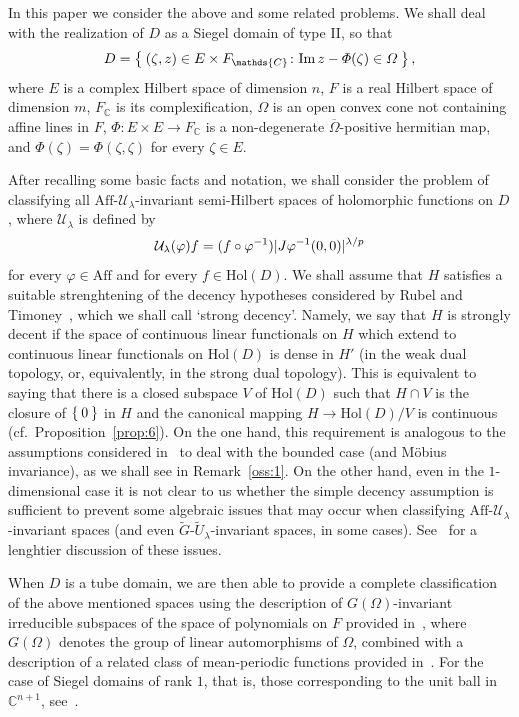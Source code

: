 \documentclass[10.5pt,reqno]{amsart}
\newcommand{\Aff}{\mathrm{Aff}}
\newcommand{\Hol}{\mathrm{Hol}}
\DeclarePairedDelimiter{\abs}{\lvert}{\rvert}
\newcommand{\C}{\mathds{C}}
\newcommand{\Uc}{\mathcal{U}}
\renewcommand{\Im}{\mathrm{Im}\,}
\renewcommand{\phi}{\varphi}
\begin{document}
\medskip

In this paper we consider the above and some related problems. We shall deal with the realization of $D$ as a Siegel domain of type II, so that
\[
D=\Set{(\zeta,z)\in E\times F_\C\colon \Im z-\Phi(\zeta)\in \Omega},
\]
where $E$ is a complex Hilbert space of dimension $n$, $F$ is a real Hilbert space of dimension $m$, $F_\C$ is its complexification, $\Omega$ is an open convex cone not containing affine lines in $F$, $\Phi\colon E\times E\to F_\C$ is a non-degenerate $\overline{\Omega}$-positive hermitian map, and $\Phi(\zeta)=\Phi(\zeta,\zeta)$ for every $\zeta\in E$. 

After recalling some basic facts and notation, we shall consider the problem of classifying all $\Aff$-$\Uc_{\lambda}$-invariant semi-Hilbert spaces of holomorphic functions on $D$, where $\Uc_\lambda$ is defined by
\[
\Uc_\lambda(\phi) f =(f\circ \phi^{-1}) \abs{J\phi^{-1}(0,0) }^{\lambda/p}
\]
for every $\phi\in \Aff$ and for every $f\in \Hol(D)$.
We shall assume that $H$ satisfies a suitable strenghtening of the decency hypotheses considered by Rubel and Timoney~\cite{RubelTimoney}, which we shall call `strong decency'. Namely, we say that $H$ is strongly decent if the space of continuous linear functionals on $H$ which extend to continuous linear functionals on $\Hol(D)$ is dense in $H'$ (in the weak dual topology, or, equivalently, in the strong dual topology). 
This is equivalent to saying that there is a closed subspace $V$ of $\Hol(D)$ such that $H\cap V$ is the closure of $\Set{0}$ in $H$ and the canonical mapping $H\to \Hol(D)/V$ is continuous (cf.~Proposition~\ref{prop:6}). On the one hand, this requirement is analogous to the   assumptions considered in~\cite{ArazyFisher2,Arazy} to deal with the bounded case (and M\"obius invariance), as we shall see in Remark~\ref{oss:1}. On the other hand, even in the $1$-dimensional case it is not clear to us whether the simple decency assumption is sufficient to prevent some algebraic issues that may occur when classifying $\Aff$-$\Uc_\lambda$-invariant spaces (and even $\widetilde G $-$\widetilde U_\lambda$-invariant spaces, in some cases). See~\cite[Section 4]{Rango1} for a lenghtier discussion of these issues.

When $D$ is a tube domain, we are then able to provide a complete classification of the above mentioned spaces using the description of $G(\Omega)$-invariant irreducible subspaces of the space of polynomials on $F$ provided in~\cite[Theorem XI.2.4]{FarautKoranyi}, where $G(\Omega)$ denotes the group of linear automorphisms of $\Omega$, combined with a description of a related class of mean-periodic functions provided in~\cite[Proposition 7.1]{Rango1}.  
For the case of Siegel domains of rank $1$, that is, those corresponding to the unit ball in $\C^{n+1}$, see~\cite{Rango1}.
\end{document}

